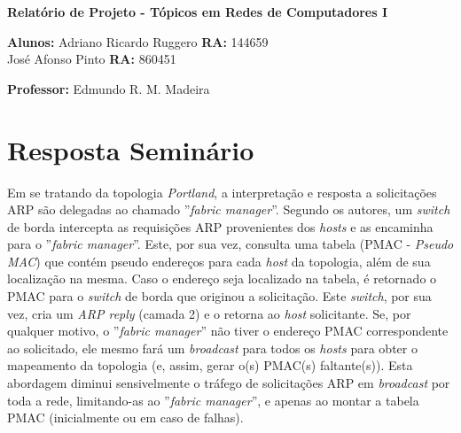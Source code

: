 \documentclass[12pt,twoside,a4paper]{article}
\begin{document}
\vskip 15mm

\begin{center} 
\textbf{Relatório de Projeto  - Tópicos em Redes de Computadores I}

\end{center}

\vskip 5mm

\textbf{Alunos:} Adriano Ricardo Ruggero \textbf{RA:} 144659\\
José Afonso Pinto \textbf{RA:} 860451



\textbf{Professor:} Edmundo R. M. Madeira

\vskip 20mm

\begin{abstract}



\end{abstract}

\newpage
\pagestyle{plain}
\headheight 0.0cm
\headsep 0.0cm
\footskip 2.2cm

\section{Resposta Seminário}
\label{sec:01}

Em se tratando da topologia \textit{Portland}, a interpretação e resposta a solicitações ARP são delegadas ao chamado ''\textit{fabric manager}''. Segundo os autores, um \textit{switch} de borda intercepta as requisições ARP provenientes dos \textit{hosts} e as encaminha para o ''\textit{fabric manager}''. Este, por sua vez, consulta uma tabela (PMAC - \textit{Pseudo MAC}) que contém pseudo endereços para cada \textit{host} da topologia, além de sua localização na mesma.
Caso o endereço seja localizado na tabela, é retornado o PMAC para o \textit{switch} de borda que originou a solicitação. Este \textit{switch}, por sua vez, cria um \textit{ARP reply} (camada 2) e o retorna ao \textit{host} solicitante.
Se, por qualquer motivo,  o ''\textit{fabric manager}'' não tiver o endereço PMAC correspondente ao solicitado, ele mesmo fará um \textit{broadcast} para todos os \textit{hosts} para obter o mapeamento da topologia (e, assim, gerar o(s) PMAC(s) faltante(s)).
Esta abordagem diminui sensivelmente o tráfego de solicitações ARP em \textit{broadcast} por toda a rede, limitando-as ao ''\textit{fabric manager}'', e apenas ao montar a tabela PMAC (inicialmente ou em caso de falhas)\cite{NiranjanMysore:2009:PSF:1594977.1592575}.




\end{document}
